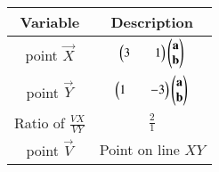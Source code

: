 \begin{tabular}[4pt]{| c| c|}
\hline
\textbf{Variable} & \textbf{Description} \\
\hline
point $\vec{X}$ & $\begin{pmatrix}3&&1\end{pmatrix}\begin{pmatrix}\mathbf{a} \\ \mathbf{b}\end{pmatrix}$ \\
\hline 
point $\vec{Y}$ & $\begin{pmatrix}1&&-3\end{pmatrix}\begin{pmatrix}\mathbf{a} \\ \mathbf{b}\end{pmatrix}$ \\
\hline
Ratio of $\frac{VX}{VY}$ & $\frac{2}{1}$ \\
\hline
point $\vec{V}$ & Point on line $XY$ \\
\hline
\end{tabular}
